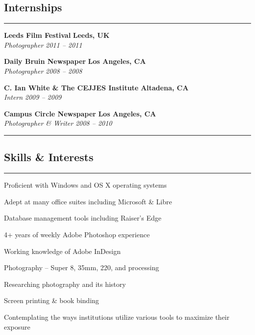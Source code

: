 \documentclass[10pt,letterpaper]{article}			%
\newcommand{\InternHeader}[4]{							%
			\textbf{#1}
			\hfill
			\textbf{#2}
			\\
			\emph{#3}
			\hfill
			\emph{#4}\par 
			}
\begin{document}
\subsection*{Internships}
\vspace{-.6em}
\hrule
\vspace{-1em}

\begin{multicols}{2}
	\InternHeader{Leeds Film Festival}{Leeds, UK}{Photographer}{2011 -- 2011}
	\InternHeader{Daily Bruin Newspaper}{Los Angeles, CA}{Photographer}{2008 -- 2008}
	\InternHeader{C. Ian White \& The CEJJES Institute}{Altadena, CA}{Intern}{2009 -- 2009}
	\InternHeader{Campus Circle Newspaper}{Los Angeles, CA}{Photographer \& Writer}{2008 -- 2010}
\end{multicols}

\vspace{-.6em}
\hrule
\vspace{-1.4em}
\subsection*{Skills \& Interests} %
\vspace{-.4em}
\hrule
\vspace{.4em}

\begin{minipage}[t]{0.5\textwidth}	
	\begin{itemize*}
	\item Proficient with Windows and OS X operating systems
	\item Adept at many office suites including Microsoft \& Libre
	\item Database management tools including Raiser's Edge
	\item 4+ years of weekly Adobe Photoshop experience
	\item Working knowledge of Adobe InDesign
	\end{itemize*}
\end{minipage}
\begin{minipage}[t]{0.5\textwidth}
	\begin{itemize*}
	\item Photography -- Super 8, 35mm, 220, and processing
	\item Researching photography and its history
	\item Screen printing \& book binding
	\item Contemplating the ways institutions utilize various tools to maximize their exposure
	\end{itemize*}
\end{minipage}

\end{document}
